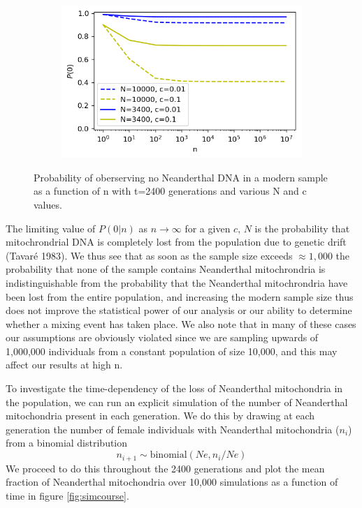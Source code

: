 \documentclass{article}
\begin{document}
\begin{figure}[h]
	\centering
	\begin{subfigure}[t]{0.45\linewidth}
		\centering
		\includegraphics[width = 1.0\linewidth, trim={0 0 0 0}, clip=true]{figures/sampn_curve.png}
	\end{subfigure}
\caption{Probability of oberserving no Neanderthal DNA in a modern sample as a function of n with t=2400 generations and various N and c values.}
\label{fig:ncurve}
\end{figure}

The limiting value of $P(0|n)$ as $n \rightarrow \infty$ for a given $c, \, N$ is the probability that mitochrondrial DNA is completely lost from the population due to genetic drift (Tavaré 1983). We thus see that as soon as the sample size exceeds $\approx 1,000$ the probability that none of the sample contains Neanderthal mitochrondria is indistinguishable from the probability that the Neanderthal mitochrondria have been lost from the entire population, and increasing the modern sample size thus does not improve the statistical power of our analysis or our ability to determine whether a mixing event has taken place. We also note that in many of these cases our assumptions are obviously violated since we are sampling upwards of 1,000,000 individuals from a constant population of size 10,000, and this may affect our results at high n.

To investigate the time-dependency of the loss of Neanderthal mitochondria in the population, we can run an explicit simulation of the number of Neanderthal mitochondria present in each generation. We do this by drawing at each generation the number of female individuals with Neanderthal mitochondria ($n_i$) from a binomial distribution
\begin{equation}
n_{i+1} \sim \text{binomial}(Ne, n_i / Ne)
\end{equation}
We proceed to do this throughout the 2400 generations and plot the mean fraction of Neanderthal mitochondria over 10,000 simulations as a function of time in figure \ref{fig:simcourse}.
\end{document}
